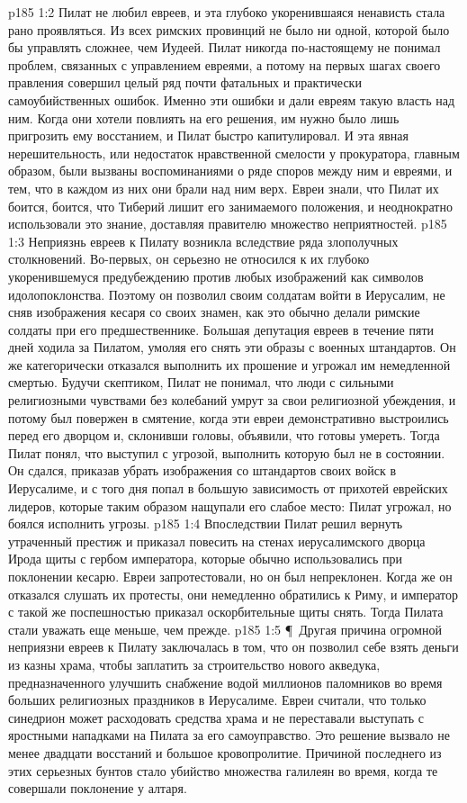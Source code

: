 \vs p185 1:2 Пилат не любил евреев, и эта глубоко укоренившаяся ненависть стала рано проявляться. Из всех римских провинций не было ни одной, которой было бы управлять сложнее, чем Иудеей. Пилат никогда по\hyp{}настоящему не понимал проблем, связанных с управлением евреями, а потому на первых шагах своего правления совершил целый ряд почти фатальных и практически самоубийственных ошибок. Именно эти ошибки и дали евреям такую власть над ним. Когда они хотели повлиять на его решения, им нужно было лишь пригрозить ему восстанием, и Пилат быстро капитулировал. И эта явная нерешительность, или недостаток нравственной смелости у прокуратора, главным образом, были вызваны воспоминаниями о ряде споров между ним и евреями, и тем, что в каждом из них они брали над ним верх. Евреи знали, что Пилат их боится, боится, что Тиберий лишит его занимаемого положения, и неоднократно использовали это знание, доставляя правителю множество неприятностей.
\vs p185 1:3 Неприязнь евреев к Пилату возникла вследствие ряда злополучных столкновений. Во\hyp{}первых, он серьезно не относился к их глубоко укоренившемуся предубеждению против любых изображений как символов идолопоклонства. Поэтому он позволил своим солдатам войти в Иерусалим, не сняв изображения кесаря со своих знамен, как это обычно делали римские солдаты при его предшественнике. Большая депутация евреев в течение пяти дней ходила за Пилатом, умоляя его снять эти образы с военных штандартов. Он же категорически отказался выполнить их прошение и угрожал им немедленной смертью. Будучи скептиком, Пилат не понимал, что люди с сильными религиозными чувствами без колебаний умрут за свои религиозной убеждения, и потому был повержен в смятение, когда эти евреи демонстративно выстроились перед его дворцом и, склонивши головы, объявили, что готовы умереть. Тогда Пилат понял, что выступил с угрозой, выполнить которую был не в состоянии. Он сдался, приказав убрать изображения со штандартов своих войск в Иерусалиме, и с того дня попал в большую зависимость от прихотей еврейских лидеров, которые таким образом нащупали его слабое место: Пилат угрожал, но боялся исполнить угрозы.
\vs p185 1:4 Впоследствии Пилат решил вернуть утраченный престиж и приказал повесить на стенах иерусалимского дворца Ирода щиты с гербом императора, которые обычно использовались при поклонении кесарю. Евреи запротестовали, но он был непреклонен. Когда же он отказался слушать их протесты, они немедленно обратились к Риму, и император с такой же поспешностью приказал оскорбительные щиты снять. Тогда Пилата стали уважать еще меньше, чем прежде.
\vs p185 1:5 \P\ Другая причина огромной неприязни евреев к Пилату заключалась в том, что он позволил себе взять деньги из казны храма, чтобы заплатить за строительство нового акведука, предназначенного улучшить снабжение водой миллионов паломников во время больших религиозных праздников в Иерусалиме. Евреи считали, что только синедрион может расходовать средства храма и не переставали выступать с яростными нападками на Пилата за его самоуправство. Это решение вызвало не менее двадцати восстаний и большое кровопролитие. Причиной последнего из этих серьезных бунтов стало убийство множества галилеян во время, когда те совершали поклонение у алтаря.
